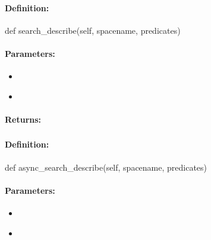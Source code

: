 \paragraph{Definition:}
\begin{pythoncode}
def search_describe(self, spacename, predicates)
\end{pythoncode}

\paragraph{Parameters:}
\begin{itemize}[noitemsep]
\item {}\\

\item {}\\

\end{itemize}

\paragraph{Returns:}


\pagebreak
\subsubsection{}
\label{api:python:async_search_describe}


\paragraph{Definition:}
\begin{pythoncode}
def async_search_describe(self, spacename, predicates)
\end{pythoncode}

\paragraph{Parameters:}
\begin{itemize}[noitemsep]
\item {}\\

\item {}\\

\end{itemize}

